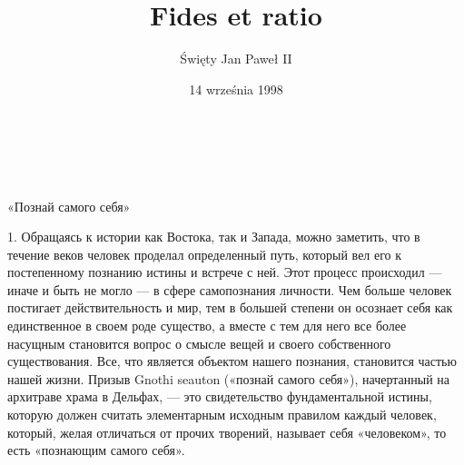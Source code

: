 \documentclass[a5paper,10pt]{article}
\title{\huge{Fides et ratio}}
\author{Święty Jan Paweł II}
\date{14 września 1998}
\newcommand\blankpage{%
    \null
    \thispagestyle{empty}%
    \addtocounter{page}{-1}%
    \newpage}
\begin{document}


\makeatletter
    \begin{titlepage}
        \begin{center}
            \vspace*{0.5cm} %
            {\huge \scshape  \bfseries  \@title }\\[2ex] 
            {\large  \@author}\\[4ex]
            \vspace*{1.5cm}
            \vfill
            {\normalsize \@date}
        \end{center}
    \end{titlepage}
\makeatother


\newpage

\pagestyle{empty}

 \vspace*{\fill}


    
    
	


\newpage


\setcounter{page}{1} %
\pagestyle{fancy}
«Познай самого себя»

1. Обращаясь к истории как Востока, так и Запада, можно заметить, что в течение
веков человек проделал определенный путь, который вел его к постепенному
познанию истины и встрече с ней. Этот процесс происходил — иначе и быть не
могло — в сфере самопознания личности. Чем больше человек постигает
действительность и мир, тем в большей степени он осознает себя как единственное
в своем роде существо, а вместе с тем для него все более насущным становится
вопрос о смысле вещей и своего собственного существования. Все, что является
объектом нашего познания, становится частью нашей жизни. Призыв Gnothi seauton
(«познай самого себя»), начертанный на архитраве храма в Дельфах, — это
свидетельство фундаментальной истины, которую должен считать элементарным
исходным правилом каждый человек, который, желая отличаться от прочих творений,
называет себя «человеком», то есть «познающим самого себя».
\end{document}
